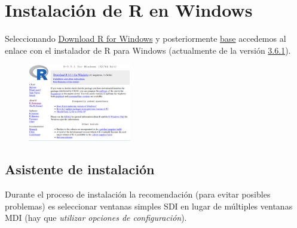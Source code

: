 \documentclass[]{book}
\begin{document}
\section{Instalación de R en Windows}\label{instalacion-de-r-en-windows}

Seleccionando \href{http://ftp.cixug.es/CRAN/bin/windows/}{Download R
for Windows} y posteriormente
\href{http://ftp.cixug.es/CRAN/bin/windows/base/}{base} accedemos al
enlace con el instalador de R para Windows (actualmente de la versión
\href{http://ftp.cixug.es/CRAN/bin/windows/base/R-3.6.1-win.exe}{3.6.1}).

\begin{figure}
\centering
\includegraphics[width=0.40000\textwidth]{figuras/R351.png}
\caption{}
\end{figure}

\subsection{Asistente de instalación}\label{asistente-de-instalacion}

Durante el proceso de instalación la recomendación (para evitar posibles
problemas) es seleccionar ventanas simples SDI en lugar de múltiples
ventanas MDI (hay que \emph{utilizar opciones de configuración}).
\end{document}
